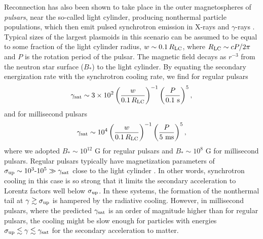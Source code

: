 Reconnection has also been shown to take place in the outer magnetospheres of {\it pulsars}, near the so-called light cylinder, producing nonthermal particle populations, which then emit pulsed synchrotron emission in X-rays and $\gamma$-rays \citep{1996A&A...311..172L, 2012MNRAS.424.2023P, 2014ApJ...780....3U, 2016MNRAS.457.2401C, PSAS18}. Typical sizes of the largest plasmoids in this scenario can be assumed to be equal to some fraction of the light cylinder radius, $w\sim 0.1 \, R_{\rm LC}$, where $R_{\rm LC}\sim c P / 2\pi$ and $P$ is the rotation period of the pulsar. The magnetic field decays as $r^{-3}$ from the neutron star surface ($B_*$) to the light cylinder. By equating the secondary energization rate with the synchrotron cooling rate, we find for regular pulsars
\begin{equation}
    \gamma_{\rm sat}\sim 3\times 10^2 
        \left(\frac{w}{0.1\, R_{\rm LC}}\right)^{-1}
        \left(\frac{P}{0.1~\text{s}}\right)^5,
\end{equation}
and for millisecond pulsars
\begin{equation}
    \gamma_{\rm sat}\sim 10^4 
        \left(\frac{w}{0.1\, R_{\rm LC}}\right)^{-1}
        \left(\frac{P}{5~\text{ms}}\right)^5,
\end{equation}
where we adopted $B_*\sim 10^{12}$ G for regular pulsars and $B_*\sim 10^8$ G for millisecond pulsars. Regular pulsars typically have magnetization parameters of $\sigma_{\rm up}\sim 10^3\text{-}10^5\gg \gamma_{\rm sat}$ close to the light cylinder \citep{1990ApJ...349..538C}. In other words, synchrotron cooling in this case is so strong that it limits the secondary acceleration to Lorentz factors well below $\sigma_{\rm up}$. In these systems, the formation of the nonthermal tail at $\gamma \gtrsim \sigma_{\rm up}$ is hampered by the radiative cooling. However, in millisecond pulsars, where the predicted $\gamma_{\rm sat}$ is an order of magnitude higher than for regular pulsars, the cooling might be slow enough for particles with energies $\sigma_{\rm up} \lesssim \gamma \lesssim \gamma_{\rm sat}$ for the secondary acceleration to matter.


